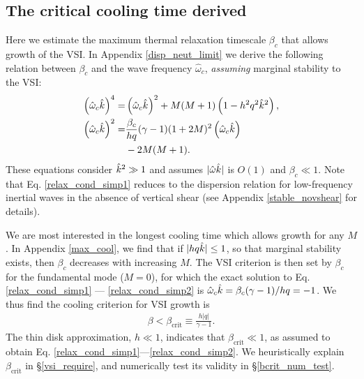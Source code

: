 \subsection{The critical cooling time derived}\label{iso_vsi_beta_crit}
Here we estimate the maximum thermal relaxation timescale 
$\beta_c$ that allows growth of the VSI. In Appendix \ref{disp_neut_limit}
we derive the following relation between $\beta_c$ and the wave
frequency $\hat{\omega}_c$, \emph{assuming} marginal stability to the
VSI:  
\begin{subequations}\begin{align}
    \left(\hat{\omega}_c\hat{k}\right)^4  =& \left(\hat{\omega}_c\hat{k}\right)^2 
  + M(M+1)\left(1-h^2q^2\hat{k}^2\right) ,\label{relax_cond_simp1}  \\
  \left(\hat{\omega}_c\hat{k}\right)^2 = & \frac{\beta_c}{h q} (\gamma-1)(1+2M)^2
  \left(\hat{\omega}_c\hat{k}\right) \label{relax_cond_simp2}\\
  &- 2M(M+1) . \notag
\end{align}\end{subequations}
These equations consider $\hat{k}^2\gg 1$ and %
assumes $|\hat{\omega}\hat{k}| $ is $O(1)$ and $\beta_c\ll 1$.   Note that 
Eq. \ref{relax_cond_simp1} reduces to the  
dispersion relation for low-frequency inertial waves in the absence of
vertical shear (see Appendix \ref{stable_novshear} for details). 
 
We are most interested in the longest cooling time which allows growth
for any $M$. In Appendix \ref{max_cool}, we find that if
$|hq\hat{k}|\leq 1$, so that marginal stability exists, then $\beta_c$
decreases with increasing $M$.    
The VSI criterion is then set by $\beta_c$ for the
fundamental mode ($M = 0$), for which the exact solution to 
Eq. \ref{relax_cond_simp1} --- \ref{relax_cond_simp2} is
$\hat{\omega}_c\hat{k} = \beta_c(\gamma-1)/hq = -1$. We thus find the
cooling criterion for VSI growth is    
 \begin{align}\label{iso_vsi_cond}
   \beta <   \beta_\mathrm{crit}  \equiv
   \frac{h|q|}{\gamma-1} . 
 \end{align}
 The thin disk approximation, $h \ll 1$, indicates that $\beta_\mathrm{crit} \ll
 1$, as assumed to obtain Eq. \ref{relax_cond_simp1}---\ref{relax_cond_simp2}. 
 We heuristically explain $\beta_\mathrm{crit}$ in \S\ref{vsi_require}, and numerically
 test its validity in \S\ref{bcrit_num_test}.  
 


